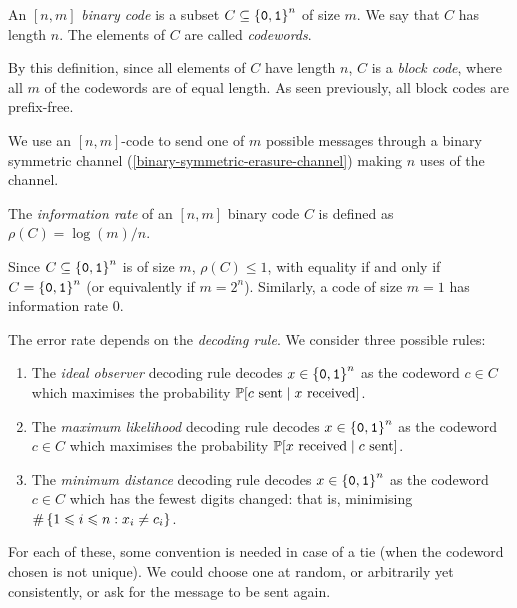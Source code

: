 \documentclass{article}
\begin{document}
\begin{definition}
	\label{binary-code-n-m}
    An $[n, m]$ \textit{binary code}
    is a subset $C \subs \binset^n$ of size $m$.
    We say that $C$ has length $n$.
    The elements of $C$ are called \textit{codewords}.
\end{definition}

\begin{note}
	By this definition,
	since all elements of $C$ have length $n$,
	$C$ is a \textit{block code},
	where all $m$ of the codewords are of equal length.
	As seen previously, all block codes are prefix-free.
\end{note}

We use an $[n, m]$-code
to send one of $m$ possible messages through a binary symmetric channel
(\ref{binary-symmetric-erasure-channel})
making $n$ uses of the channel.

\begin{definition}
	\label{information-rate}
    The \textit{information rate} of an $[n, m]$ binary code $C$
    is defined as $\rho(C) = \log(m)/n$.
\end{definition}

\begin{corollary}
    Since $C \subs \binset^n$
    is of size $m$, $\rho(C) \leq 1$,
    with equality if and only if $C = \binset^n$
    (or equivalently if $m = 2^n$).
    Similarly, a code of size $m=1$ has information rate 0. 
\end{corollary}

The error rate depends on the \textit{decoding rule}.
We consider three possible rules:

\begin{enumerate}
    \item The \textit{ideal observer} decoding rule decodes $x \in \binset^n$ as the codeword $c \in C$ which maximises the probability $\P[c \text{ sent} \mid x \text{ received}]$.
    \item The \textit{maximum likelihood} decoding rule decodes $x \in \binset^n$ as the codeword $c \in C$ which maximises the probability $\P[x \text{ received} \mid c \text{ sent}]$.
    \item The \textit{minimum distance} decoding rule decodes $x \in \binset^n$ as the codeword $c \in C$ which has the fewest digits changed: that is, minimising $\#\set{1 \leq i \leq n : x_i \neq c_i}$.
\end{enumerate}

\begin{note}
	For each of these, some convention is needed in case of a tie
	(when the codeword chosen is not unique).
	We could choose one at random,
	or arbitrarily yet consistently,
	or ask for the message to be sent again.
\end{note}
\end{document}
